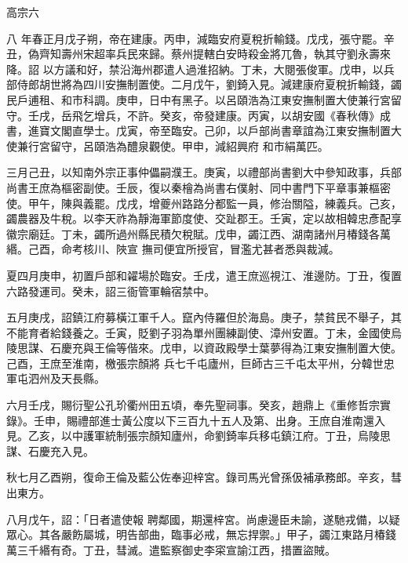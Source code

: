
\begin{pinyinscope}

 高宗六



 八
 年春正月戊子朔，帝在建康。丙申，減臨安府夏稅折輸錢。戊戌，張守罷。辛丑，偽齊知壽州宋超率兵民來歸。蔡州提轄白安時殺金將兀魯，執其守劉永壽來降。詔
 以方議和好，禁沿海州郡遣人過淮招納。丁未，大閱張俊軍。戊申，以兵部侍郎胡世將為四川安撫制置使。二月戊午，劉錡入見。減建康府夏稅折輸錢，蠲民戶逋租、和市科調。庚申，日中有黑子。以呂頤浩為江東安撫制置大使兼行宮留守。壬戌，岳飛乞增兵，不許。癸亥，帝發建康。丙寅，以胡安國《春秋傳》成書，進寶文閣直學士。戊寅，帝至臨安。己卯，以戶部尚書章誼為江東安撫制置大使兼行宮留守，呂頤浩為醴泉觀使。甲申，減紹興府
 和市絹萬匹。



 三月己丑，以知南外宗正事仲儡嗣濮王。庚寅，以禮部尚書劉大中參知政事，兵部尚書王庶為樞密副使。壬辰，復以秦檜為尚書右僕射、同中書門下平章事兼樞密使。甲午，陳與義罷。戊戌，增夔州路路分都監一員，修治關隘，練義兵。己亥，蠲農器及牛稅。以李天祚為靜海軍節度使、交趾郡王。壬寅，定以故相韓忠彥配享徽宗廟廷。丁未，蠲所過州縣民積欠稅賦。戊申，蠲江西、湖南諸州月椿錢各萬緡。己酉，命考核川、陜宣
 撫司便宜所授官，冒濫尤甚者悉與裁減。



 夏四月庚申，初置戶部和糴場於臨安。壬戌，遣王庶巡視江、淮邊防。丁丑，復置六路發運司。癸未，詔三衙管軍輪宿禁中。



 五月庚戌，詔鎮江府募橫江軍千人。竄內侍羅但於海島。庚子，禁貧民不舉子，其不能育者給錢養之。壬寅，貶劉子羽為單州團練副使、漳州安置。丁未，金國使烏陵思謀、石慶充與王倫等偕來。戊申，以資政殿學士葉夢得為江東安撫制置大使。己酉，王庶至淮南，檄張宗顏將
 兵七千屯廬州，巨師古三千屯太平州，分韓世忠軍屯泗州及天長縣。



 六月壬戌，賜衍聖公孔玠衢州田五頃，奉先聖祠事。癸亥，趙鼎上《重修哲宗實錄》。壬申，賜禮部進士黃公度以下三百九十五人及第、出身。王庶自淮南還入見。乙亥，以中護軍統制張宗顏知廬州，命劉錡率兵移屯鎮江府。丁丑，烏陵思謀、石慶充入見。



 秋七月乙酉朔，復命王倫及藍公佐奉迎梓宮。錄司馬光曾孫伋補承務郎。辛亥，彗出東方。



 八月戊午，詔：「日者遣使報
 聘鄰國，期還梓宮。尚慮邊臣未諭，遂馳戎備，以疑眾心。其各嚴飭屬城，明告部曲，臨事必戒，無忘捍禦。」甲子，蠲江東路月椿錢萬三千緡有奇。丁丑，彗滅。遣監察御史李寀宣諭江西，措置盜賊。




\end{pinyinscope}
